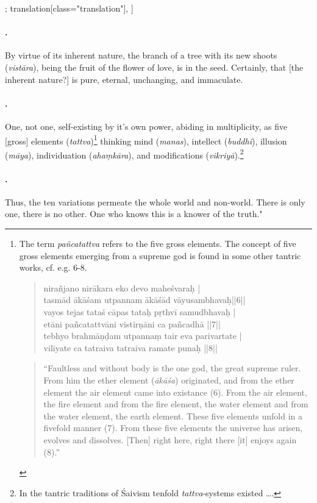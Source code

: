 \begin{alignment}[
  texts=edition[class="edition"];
  translation[class="translation"],
  ]
\begin{translation}
\begin{tlate}
      \paragraph{\textsuperscript{}.} By virtue of its inherent nature, the branch of a tree with its new shoots (\textit{vistāra}), being the fruit of the flower of love, is in the seed. Certainly, that [the inherent nature?] is pure, eternal, unchanging, and immaculate.
      \paragraph{\textsuperscript{}.} One, not one, self-existing by it's own power, abiding in multiplicity, as five [gross] elements (\textit{tattva})\footnote{The term \textit{pañcatattva} refers to the five gross elements. The concept of five gross elements emerging from a supreme god is found in some other tantric works, cf. e.g.  6-8. \begin{quote}
nirañjano nirākara eko devo maheśvaraḥ |\\
tasmād ākāśam utpannam ākāśād vāyusambhavaḥ||6||\\
vayos tejas tataś cāpas tataḥ pṛthvī samudbhavaḥ |\\
etāni pañcatattvāni vistīrṇāni ca pañcadhā ||7||\\
tebhyo brahmāṇḍam utpannaṃ tair eva parivartate |\\
vilīyate ca tatraiva tatraiva ramate punaḥ ||8|| \end{quote}
\begin{quote}
``Faultless and without body is the one god, the great supreme ruler. From him the ether element (\textit{ākāśa}) originated, and from the ether element the air element came into existance (6). From the air element, the fire element and from the fire element, the water element and from the water element, the earth element. These five elements unfold in a fivefold manner (7). From these five elements the universe has arisen, evolves and dissolves. [Then] right here, right there [it] enjoys again (8).''\end{quote}} thinking mind (\textit{manas}), intellect (\textit{buddhi}), illusion (\textit{māya}), individuation (\textit{ahaṃkāra}), and modifications (\textit{vikriyā}).\footnote{In the tantric traditions of Śaivism tenfold \textit{tattva}-systems existed \ldots.}
  \paragraph{\textsuperscript{}.} Thus, the ten variations permeate the whole world and non-world. There is only one, there is no other. One who knows this is a knower of the truth."\\


\end{tlate}
\end{translation}
\end{alignment}
